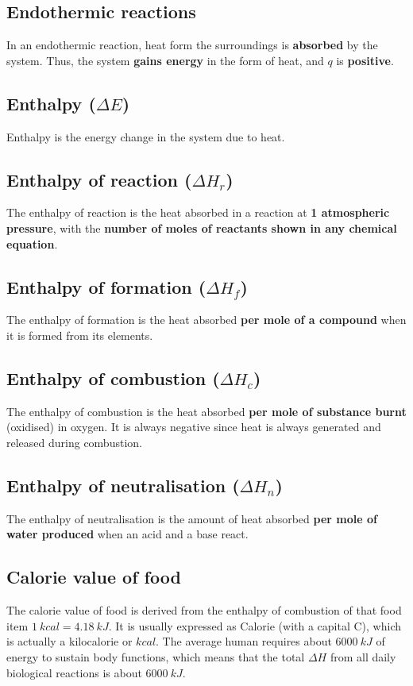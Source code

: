 \documentclass[11pt]{article}
\begin{document}
\subsection{Endothermic reactions}
\label{sec:orgb1e17c9}
In an endothermic reaction, heat form the surroundings is \textbf{absorbed} by the system. Thus, the system \textbf{gains energy} in the form of heat, and \(q\) is \textbf{positive}.

\subsection{Enthalpy (\(\Delta E\))}
\label{sec:org835cb47}
Enthalpy is the energy change in the system due to heat.

\subsection{Enthalpy of reaction (\(\Delta H_r\))}
\label{sec:org88b49e8}
The enthalpy of reaction is the heat absorbed in a reaction at \textbf{1 atmospheric pressure}, with the \textbf{number of moles of reactants shown in any chemical equation}.

\subsection{Enthalpy of formation (\(\Delta H_f\))}
\label{sec:org4ccecc0}
The enthalpy of formation is the heat absorbed \textbf{per mole of a compound} when it is formed from its elements.

\subsection{Enthalpy of combustion (\(\Delta H_c\))}
\label{sec:orgef8cd32}
The enthalpy of combustion is the heat absorbed \textbf{per mole of substance burnt} (oxidised) in oxygen. It is always negative since heat is always generated and released during combustion.

\subsection{Enthalpy of neutralisation (\(\Delta H_n\))}
\label{sec:orge13a8e9}
The enthalpy of neutralisation is the amount of heat absorbed \textbf{per mole of water produced} when an acid and a base react.

\newpage

\subsection{Calorie value of food}
\label{sec:org51b8cc4}
The calorie value of food is derived from the enthalpy of combustion of that food item \(\qty{1}{\unit{kcal}} = \qty{4.18}{kJ}\). It is usually expressed as Calorie (with a capital C), which is actually a kilocalorie or \(\unit{kcal}\). The average human requires about \(\qty{6000}{\unit{kJ}}\) of energy to sustain body functions, which means that the total \(\Delta H\) from all daily biological reactions is about \(\qty{6000}{\unit{kJ}}\).
\end{document}
